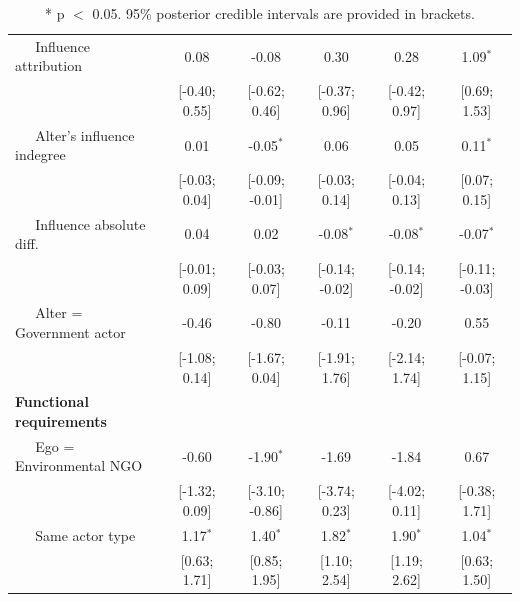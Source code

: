\documentclass[12pt,onesided,pdflatex]{amsart}
\begin{document}
\begin{table}[ht]
\begin{tabular}{lccccc}
  $\;\;\;\;$ Influence attribution & 0.08 & -0.08 & 0.30 & 0.28 & 1.09$^{\ast}$ \\ 
   & [-0.40; 0.55] & [-0.62; 0.46] & [-0.37; 0.96] & [-0.42; 0.97] & [0.69; 1.53] \\ 
  $\;\;\;\;$ Alter's influence indegree & 0.01 & -0.05$^{\ast}$ & 0.06 & 0.05 & 0.11$^{\ast}$ \\ 
   & [-0.03; 0.04] & [-0.09; -0.01] & [-0.03; 0.14] & [-0.04; 0.13] & [0.07; 0.15] \\ 
  $\;\;\;\;$ Influence absolute diff. & 0.04 & 0.02 & -0.08$^{\ast}$ & -0.08$^{\ast}$ & -0.07$^{\ast}$ \\ 
   & [-0.01; 0.09] & [-0.03; 0.07] & [-0.14; -0.02] & [-0.14; -0.02] & [-0.11; -0.03] \\ 
  $\;\;\;\;$ Alter = Government actor & -0.46 & -0.80 & -0.11 & -0.20 & 0.55 \\ 
   & [-1.08; 0.14] & [-1.67; 0.04] & [-1.91; 1.76] & [-2.14; 1.74] & [-0.07; 1.15] \\ 
  \textbf{Functional requirements} &  &  &  &  &  \\ 
  $\;\;\;\;$ Ego = Environmental NGO & -0.60 & -1.90$^{\ast}$ & -1.69 & -1.84 & 0.67 \\ 
   & [-1.32; 0.09] & [-3.10; -0.86] & [-3.74; 0.23] & [-4.02; 0.11] & [-0.38; 1.71] \\ 
  $\;\;\;\;$ Same actor type & 1.17$^{\ast}$ & 1.40$^{\ast}$ & 1.82$^{\ast}$ & 1.90$^{\ast}$ & 1.04$^{\ast}$ \\ 
   & [0.63; 1.71] & [0.85; 1.95] & [1.10; 2.54] & [1.19; 2.62] & [0.63; 1.50] \\ 
   \hline
\hline
\end{tabular}
\endgroup
\caption{* p $<$ 0.05. 95\% posterior credible intervals are provided in brackets.} 
\label{tab:regTable_latSpace}
\end{table}
\end{document}
